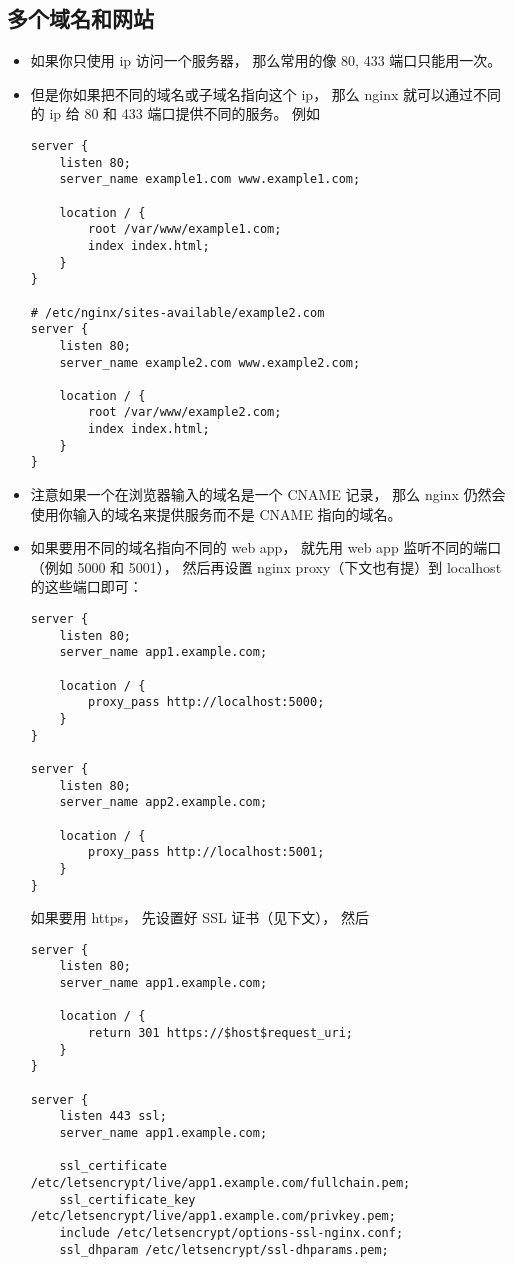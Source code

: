 \subsection{多个域名和网站}
\begin{itemize}
\item 如果你只使用 ip 访问一个服务器， 那么常用的像 80, 433 端口只能用一次。
\item 但是你如果把不同的域名或子域名指向这个 ip， 那么 nginx 就可以通过不同的 ip 给 80 和 433 端口提供不同的服务。 例如
\begin{lstlisting}[language=none]
server {
    listen 80;
    server_name example1.com www.example1.com;

    location / {
        root /var/www/example1.com;
        index index.html;
    }
}

# /etc/nginx/sites-available/example2.com
server {
    listen 80;
    server_name example2.com www.example2.com;

    location / {
        root /var/www/example2.com;
        index index.html;
    }
}
\end{lstlisting}
\item 注意如果一个在浏览器输入的域名是一个 CNAME 记录， 那么 nginx 仍然会使用你输入的域名来提供服务而不是 CNAME 指向的域名。
\item 如果要用不同的域名指向不同的 web app， 就先用 web app 监听不同的端口（例如 5000 和 5001）， 然后再设置 nginx proxy（下文也有提）到 localhost 的这些端口即可：
\begin{lstlisting}[language=none]
server {
    listen 80;
    server_name app1.example.com;

    location / {
        proxy_pass http://localhost:5000;
    }
}

server {
    listen 80;
    server_name app2.example.com;

    location / {
        proxy_pass http://localhost:5001;
    }
}
\end{lstlisting}
如果要用 https， 先设置好 SSL 证书（见下文）， 然后
\begin{lstlisting}[language=none]
server {
    listen 80;
    server_name app1.example.com;

    location / {
        return 301 https://$host$request_uri;
    }
}

server {
    listen 443 ssl;
    server_name app1.example.com;

    ssl_certificate /etc/letsencrypt/live/app1.example.com/fullchain.pem;
    ssl_certificate_key /etc/letsencrypt/live/app1.example.com/privkey.pem;
    include /etc/letsencrypt/options-ssl-nginx.conf;
    ssl_dhparam /etc/letsencrypt/ssl-dhparams.pem;


\end{lstlisting}
\end{itemize}
